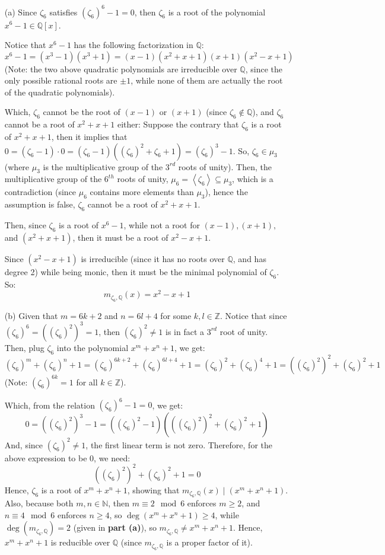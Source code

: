 \documentclass{article}
\begin{document}
\begin{itemize}
    \item[(a)] Since $\zeta_6$ satisfies $(\zeta_6)^6-1 = 0$, then $\zeta_6$ is a root of the polynomial $x^6-1 \in\mathbb{Q}[x]$.
    
    Notice that $x^6-1$ has the following factorization in $\mathbb{Q}$:
    $$x^6-1 = (x^3-1)(x^3+1)=(x-1)(x^2+x+1)(x+1)(x^2-x+1)$$
    (Note: the two above quadratic polynomials are irreducible over $\mathbb{Q}$, since the only possible rational roots are $\pm 1$, while none of them are actually the root of the quadratic polynomials).

    Which, $\zeta_6$ cannot be the root of $(x-1)$ or $(x+1)$ (since $\zeta_6\notin\mathbb{Q}$), and $\zeta_6$ cannot be a root of $x^2+x+1$ either:
    Suppose the contrary that $\zeta_6$ is a root of $x^2+x+1$, then it implies that $0 = (\zeta_6-1)\cdot 0 = (\zeta_6-1)((\zeta_6)^2+\zeta_6+1) = (\zeta_6)^3-1$. So, $\zeta_6 \in \mu_3$ (where $\mu_3$ is the multiplicative group of the $3^{rd}$ roots of unity). Then, the multiplicative group of the $6^{th}$ roots of unity, $\mu_6 = \left<\zeta_6\right> \subseteq \mu_3$, which is a contradiction (since $\mu_6$ contains more elements than $\mu_3$), hence the assumption is false, $\zeta_6$ cannot be a root of $x^2+x+1$.

    Then, since $\zeta_6$ is a root of $x^6-1$, while not a root for $(x-1),(x+1),$ and $(x^2+x+1)$, then it must be a root of $x^2-x+1$.

    Since $(x^2-x+1)$ is irreducible (since it has no roots over $\mathbb{Q}$, and has degree 2) while being monic, then it must be the minimal polynomial of $\zeta_6$. So:
    $$m_{\zeta_6,\mathbb{Q}}(x) = x^2-x+1$$

    \hfil

    \item[(b)] Given that $m=6k+2$ and $n=6l+4$ for some $k,l\in\mathbb{Z}$. Notice that since $(\zeta_6)^6 = ((\zeta_6)^2)^3 = 1$, then $(\zeta_6)^2\neq 1$ is in fact a $3^{rd}$ root of unity. Then, plug $\zeta_6$ into the polynomial $x^m+x^n+1$, we get:
    $$(\zeta_6)^m+(\zeta_6)^n+1 = (\zeta_6)^{6k+2}+(\zeta_6)^{6l+4}+1 = (\zeta_6)^2 + (\zeta_6)^4 +1 = ((\zeta_6)^2)^2+(\zeta_6)^2+1$$
    (Note: $(\zeta_6)^{6k}=1$ for all $k\in\mathbb{Z}$).
    
    Which, from the relation $(\zeta_6)^6-1=0$, we get:
    $$0=((\zeta_6)^2)^3-1 = ((\zeta_6)^2-1)(((\zeta_6)^2)^2+(\zeta_6)^2+1)$$
    And, since $(\zeta_6)^2 \neq 1$, the first linear term is not zero. Therefore, for the above expression to be $0$, we need:
    $$((\zeta_6)^2)^2+(\zeta_6)^2+1 = 0$$
    Hence, $\zeta_6$ is a root of $x^m+x^n+1$, showing that $m_{\zeta_6,\mathbb{Q}}(x)\mid (x^m+x^n+1)$.
    Also, because both $m,n\in\mathbb{N}$, then $m\equiv 2\mod 6$ enforces $m\geq 2$, and $n\equiv 4\mod 6$ enforces $n\geq 4$, so $\deg(x^m+x^n+1)\geq 4$, while $\deg(m_{\zeta_6,\mathbb{Q}}) = 2$ (given in \textbf{part (a)}), so $m_{\zeta_6,\mathbb{Q}}\neq x^m+x^n+1$. Hence, $x^m+x^n+1$ is reducible over $\mathbb{Q}$ (since $m_{\zeta_6,\mathbb{Q}}$ is a proper factor of it).
\end{itemize}
\end{document}
